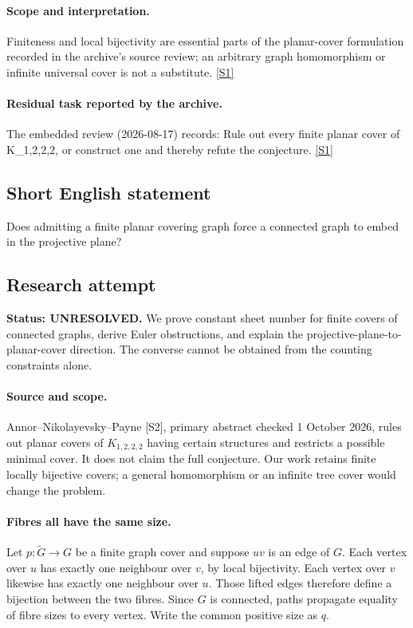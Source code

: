 \documentclass[11pt,a4paper]{article}
\newcommand{\sref}[2]{\hyperlink{source:#1:#2}{[S#2]}}
\begin{document}
\paragraph{Scope and interpretation.}

Finiteness and local bijectivity are essential parts of the planar-cover formulation recorded in the archive’s source review; an arbitrary graph homomorphism or infinite universal cover is not a substitute. \sref{1406}{1}

\paragraph{Residual task reported by the archive.}

The embedded review (2026-08-17) records: Rule out every finite planar cover of K\_{1,2,2,2}, or construct one and thereby refute the conjecture. \sref{1406}{1}

\subsection{Short English statement}

Does admitting a finite planar covering graph force a connected graph to embed in the projective plane?

\subsection{Research attempt}
\textbf{Status: UNRESOLVED.} We prove constant sheet number for finite covers of connected graphs, derive Euler obstructions, and explain the projective-plane-to-planar-cover direction. The converse cannot be obtained from the counting constraints alone.

\paragraph{Source and scope.}
Annor--Nikolayevsky--Payne [S2], primary abstract checked 1 October 2026, rules out planar covers of $K_{1,2,2,2}$ having certain structures and restricts a possible minimal cover. It does not claim the full conjecture. Our work retains finite locally bijective covers; a general homomorphism or an infinite tree cover would change the problem.

\paragraph{Fibres all have the same size.}
Let $p:\widetilde G\to G$ be a finite graph cover and suppose $uv$ is an edge of $G$. Each vertex over $u$ has exactly one neighbour over $v$, by local bijectivity. Each vertex over $v$ likewise has exactly one neighbour over $u$. Those lifted edges therefore define a bijection between the two fibres. Since $G$ is connected, paths propagate equality of fibre sizes to every vertex. Write the common positive size as $q$.
\end{document}
